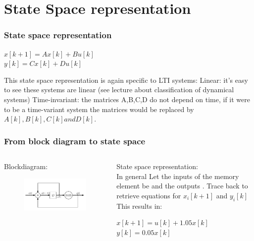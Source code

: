 \section{State Space representation}
\begin{frame}
	\frametitle{State space representation}
	\begin{center}
	$x[k+1] = A x[k] + B u[k]$ \\
	$y[k] = C x[k] + D u[k] $ \\
	\end{center}
	This state space representation is again specific to LTI systems:
	Linear: it’s easy to see these systems are linear (see lecture about classification of dynamical systems)
	Time-invariant: the matrices A,B,C,D do not depend on time, if it were to be a time-variant system the matrices would be replaced by $A[k], B[k], C[k] and D[k]$. \\
\end{frame}
\begin{frame}
\frametitle{From block diagram to state space }
\begin{columns}

\begin{column}{0.5\textwidth}

	Blockdiagram:
	\begin{figure}
\centering
\includegraphics[width=1\linewidth]{Images/discrete_time_systems_3}
\caption{}
\label{fig:discrete_time_systems_3}
\end{figure}
\end{column}
\begin{column}{0.5\textwidth}
	State space representation: \\
	In general
	Let the inputs of the memory element be	and the outputs	.
	Trace back to retrieve equations for $x_i[k+1] $   and $y_i[k]$ 
	This results in:
	\begin{center}
	$x[k+1] = u[k] + 1.05 x[k] $
	$y[k] = 0.05 x[k]$
	\end{center}
	
\end{column}
\end{columns}
\end{frame}
